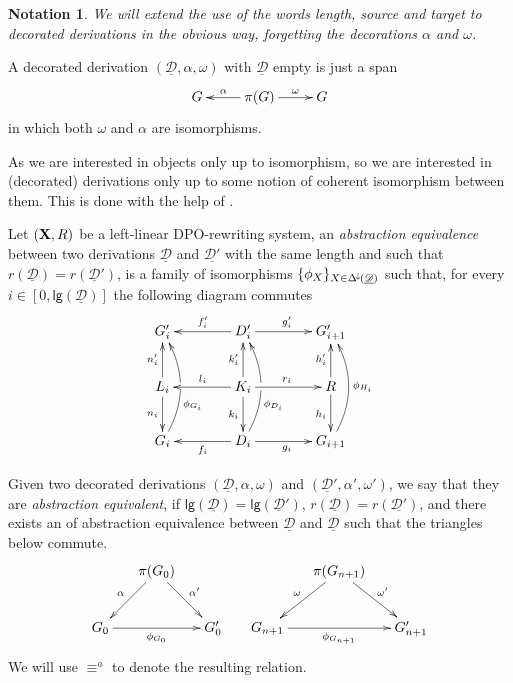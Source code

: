 \documentclass[a4paper,UKenglish,cleveref,pdftex, thm-restate,numberwithinsect]{lipics}
\newcommand{\Deltamin}{\Delta^{\hspace{-1pt}\downarrow\hspace{-1pt}}}
\def\R{\mathsf{R}}
\def\X{\textbf {\textup{X}}}
\newcommand{\dder}[1]{\mathscr{#1}}
\newcommand{\der}[1]{\underline{\dder{#1}}}
\newcommand{\lgh}[0]{\mathsf{lg}}
\newtheorem*{notation}{Notation}
\begin{document}
\begin{notation}
	We will extend the use of the words length, source and target to decorated derivations in the obvious way, forgetting the decorations $\alpha$ and $\omega$.
\end{notation}

\begin{example}A decorated derivation $(\der{D}, \alpha, \omega)$ with $\der{D}$ empty is just a span
	\[\xymatrix{G & \pi(G) \ar[r]^-{\omega} \ar[l]_-{\alpha} & G}\]
	in which both $\omega$ and $\alpha$ are isomorphisms.
\end{example}

As we are interested in objects only up to isomorphism, so we are interested in (decorated) derivations only up to some notion of coherent isomorphism between them. This is done with the help of .

\begin{definition}Let $(\X, \R)$ be a left-linear DPO-rewriting system,  an \emph{abstraction equivalence} between two derivations $\der{D}$ and $\der{D'}$ with the same length and such that $r(\der{D})=r(\der{D}')$, is a family of isomorphisms $\{\phi_X\}_{X\in \Deltamin(\der{D})}$ such that, for every $i\in [0, \lgh(\der{D})]$ the following diagram commutes
	\[\xymatrix@C=40pt{G'_i&D'_i \ar[r]^{g'_i} \ar[l]_{f'_i}&G'_{i+1}\\  L_i \ar[u]^{n'_i} \ar[d]_{n_i}& K_i \ar[u]^{k'_i} \ar[d]_{k_i} \ar[r]^{r_i} \ar[l]_{l_i} &R\ar[u]^{h'_i} \ar[d]_{h_i}\\G_i \ar@/_.45cm/[uu]_(.35){\phi_{G_i}}|\hole&D_i\ar[l]^{f_i}\ar@/_.45cm/[uu]_(.35){\phi_{D_i}}|\hole \ar[r]_{g_i}&G_{i+1}\ar@/_.45cm/[uu]_{\phi_{H_i}}}\]

Given two decorated derivations $(\der{D}, \alpha, \omega)$ and $(\der{D}', \alpha', \omega')$, we say that they are \emph{abstraction equivalent}, if $\lgh(\der{D})=\lgh(\der{D}')$, $r(\der{D})=r(\der{D'})$, and there exists an of abstraction equivalence between $\der{D}$ and  $\der{D}$ such that the triangles below commute.
\[\xymatrix@C=15pt{&\pi(G_0) \ar[dr]^{\alpha'} \ar[dl]_{\alpha}&&& \pi(G_{n+1}) \ar[dr]^{\omega'} \ar[dl]_{\omega}\\ G_0 \ar[rr]_{\phi_{G_0}} && G'_0 &G_{n+1} \ar[rr]_{\phi_{G_{n+1}}} && G'_{n+1} } \]
We will use $\equiv^a$ to denote the resulting relation.
\end{definition}
\end{document}
